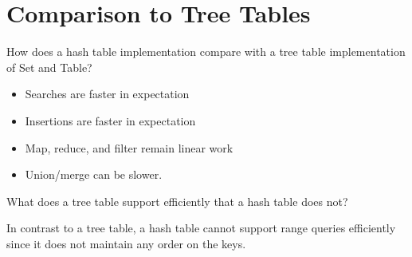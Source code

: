 

\section{Comparison to Tree Tables}

\begin{question}
How does a hash table implementation compare with a tree table
implementation of Set and Table?
\end{question}

\begin{itemize}
\item Searches are faster in expectation
\item Insertions are faster in expectation
\item Map, reduce, and filter remain linear work
\item Union/merge can be slower.
\end{itemize}

\begin{question}
What does a tree table support efficiently that a hash table does not?
\end{question}

In contrast to a tree table, a hash table cannot support range queries
efficiently since it does not maintain any order on the keys.

\flushchapter
